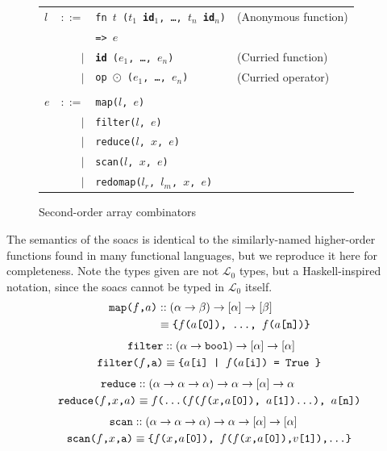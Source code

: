 \documentclass{sigplanconf}  %
\newcommand{\LO}{$\mathcal{L}_0$}
\begin{document}
\begin{figure}[bt]
\begin{tabular}{lrll}
$l$ & $::=$ & {\tt fn $t$ ($t_{1}$ {\bf id}$_{1}$, \ldots, $t_{n}$ {\bf id}$_{n}$)} & (Anonymous function) \\
&     & {\tt => $e$} \\
& $|$ & {\tt {\bf id} ($e_{1}$, \ldots, $e_{n}$)} & (Curried function) \\
& $|$ & {\tt op $\odot$ ($e_{1}$, \ldots, $e_{n}$)} & (Curried operator) \\
\\
$e$ & $::=$ & {\tt map($l$, $e$)} \\
    & $|$ & {\tt filter($l$, $e$)} \\
    & $|$ & {\tt reduce($l$, $x$, $e$)} \\
    & $|$ & {\tt scan($l$, $x$, $e$)} \\
    & $|$ & {\tt redomap($l_{r}$, $l_{m}$, $x$, $e$)} \\
\end{tabular}
\caption{Second-order array combinators}
\label{fig:soacs}
\end{figure}

The semantics of the {\sc soac}s is identical to the similarly-named
higher-order functions found in many functional languages, but we
reproduce it here for completeness.  Note the types given are not \LO{}
types, but a Haskell-inspired notation, since the {\sc soac}s cannot be 
typed in \LO{} itself.
\begin{align*}
\text{\tt map($f$,$a$)}
& :: (\alpha\rightarrow\beta)\rightarrow[\alpha]\rightarrow[\beta] \\
& \equiv \text{\tt\{$f$($a$[0]), \ldots, $f$($a$[n])\}}
\end{align*}
\begin{align*}
\text{\tt filter}
& :: (\alpha\rightarrow{\tt bool})\rightarrow[\alpha]\rightarrow[\alpha] \\
\text{\tt filter($f$,a)} & \equiv \text{\tt\{$a$[i] | $f$($a$[i]) = {\tt True }\}}
\end{align*}
\begin{align*}
\text{\tt reduce}
& :: (\alpha\rightarrow\alpha\rightarrow\alpha)\rightarrow\alpha\rightarrow[\alpha]\rightarrow\alpha \\
\text{\tt reduce($f$,$x$,$a$)} & \equiv \text{\tt $f$(\ldots($f$($f$($x$,$a$[0]), $a$[1])\ldots), $a$[n])}
\end{align*}
\begin{align*}
\text{\tt scan}
& :: (\alpha\rightarrow\alpha\rightarrow\alpha)\rightarrow\alpha\rightarrow[\alpha]\rightarrow[\alpha] \\
\text{\tt scan($f$,$x$,a)} & \equiv \text{\tt\{$f$($x$,$a$[0]), $f$($f$($x$,$a$[0]),$v$[1]),\ldots\}}
\end{align*}
\end{document}
